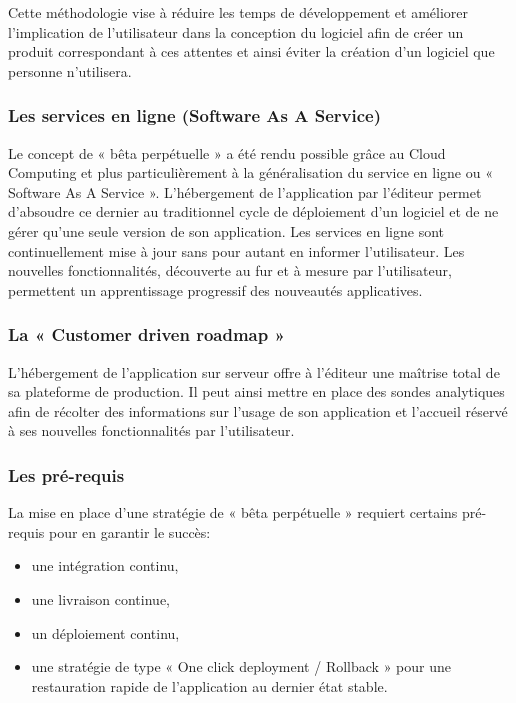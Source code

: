       Cette méthodologie vise à réduire les temps de développement et améliorer l’implication de l’utilisateur dans la conception du logiciel afin de créer un produit correspondant à ces attentes et ainsi éviter la création d’un logiciel que personne n’utilisera.

      \subsubsection{Les services en ligne (Software As A Service)}
      Le concept de « bêta perpétuelle » a été rendu possible grâce au Cloud Computing et plus particulièrement à la généralisation du service en ligne ou « Software As A Service ». L’hébergement de l’application par l’éditeur permet d’absoudre ce dernier au traditionnel cycle de déploiement d’un logiciel et de ne gérer qu’une seule version de son application. Les services en ligne sont continuellement mise à jour sans pour autant en informer l’utilisateur. Les nouvelles fonctionnalités, découverte au fur et à mesure par l’utilisateur, permettent un apprentissage progressif des nouveautés applicatives.

      \subsubsection{La « Customer driven roadmap »}
      L’hébergement de l’application sur serveur offre à l’éditeur une maîtrise total de sa plateforme de production. Il peut ainsi mettre en place des sondes analytiques afin de récolter des informations sur l’usage de son application et l’accueil réservé à ses nouvelles fonctionnalités par l’utilisateur.

      \subsubsection{Les pré-requis}
      La mise en place d’une stratégie de « bêta perpétuelle » requiert certains pré-requis pour en garantir le succès:\\
      \begin{itemize}
        \item une intégration continu,
        \item une livraison continue,
        \item un déploiement continu,
        \item une stratégie de type « One click deployment / Rollback » pour une restauration rapide de l’application au dernier état stable.\\
      \end{itemize}

